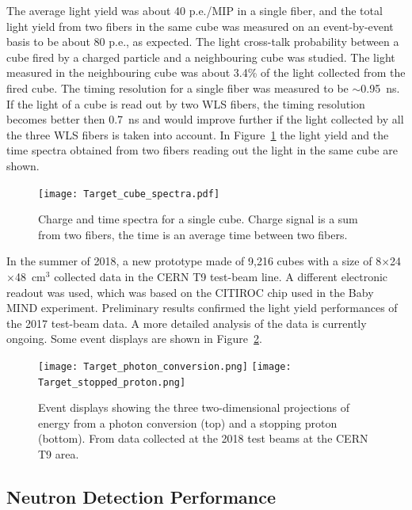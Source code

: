 The average light yield was about 40 p.e./MIP in a single fiber, and the total light yield from two fibers in the same cube was measured on an event-by-event basis to be about 80 p.e., as expected.
The light cross-talk probability between a cube fired by a charged particle and a neighbouring cube was studied. The light measured in the neighbouring cube was about 3.4\% of the light collected from the fired cube. 
The timing resolution for a single fiber was measured to be $\sim$0.95~ns. If the light of a cube is read out by two WLS fibers, the timing resolution becomes better then 0.7~ns and would improve further if the light collected by all the three WLS fibers is taken into account.
In Figure~\ref{fig:testbeam2017} the light yield and the time spectra obtained from two fibers reading out the light in the same cube are shown.

\begin{figure}
\begin{center}
  \texttt{[image: Target\_cube\_spectra.pdf]}
\caption{\label{fig:testbeam2017} Charge and time spectra for a single cube. Charge signal is a sum from two fibers, the time is an average time between two fibers.} 
\end{center}
\end{figure}

In the summer of 2018, a new prototype made of 9,216 cubes with a size of 8$\times$24$\times$48~cm$^{3}$  collected data in the CERN T9 test-beam line.
A different electronic readout was used, which was based on the CITIROC chip used in the Baby MIND experiment.
Preliminary results confirmed the light yield performances of the 2017 test-beam data. A more detailed analysis of the data is currently ongoing.
Some event displays are shown in Figure~\ref{fig:testbeam2018}.

\begin{figure}
\begin{center}
\texttt{[image: Target\_photon\_conversion.png]}
\texttt{[image: Target\_stopped\_proton.png]}
\caption{\label{fig:testbeam2018} Event displays showing the three two-dimensional projections of energy from a photon conversion (top) and a stopping proton (bottom). From data collected at the 2018 test beams at the CERN T9 area.} 
\end{center}
\end{figure}



\subsection{Neutron Detection Performance}

